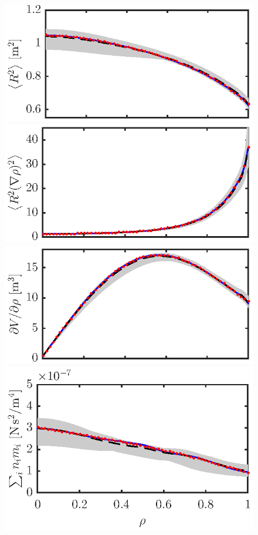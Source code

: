 \documentclass[12pt,lot, lof]{puthesis}
\begin{document}
\begin{figure}
\centering 
\includegraphics{fig1a} \hspace{-3em} \\
\includegraphics{fig1b} \hspace{-3em} \\
\includegraphics{fig1c} \hspace{-3em} \\[-.4em]
\includegraphics{fig1d} \hspace{-3em}

\end{figure}
\end{document}
